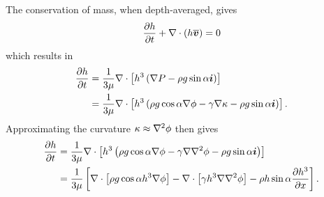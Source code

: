 The conservation of mass, when depth-averaged, gives 
\begin{align}
    \frac{\partial h}{\partial t} + \nabla \cdot \left( h\overline{\boldsymbol{v}} \right) = 0
\end{align}
which results in 
\begin{align}
    \nonumber \frac{\partial h}{\partial t} &= \frac{1}{3\mu} \nabla \cdot \left[ h^3 \left( \nabla P - \rho g \sin \alpha \boldsymbol{i} \right) \right]\\
    &= \frac{1}{3\mu} \nabla \cdot \left[ h^3 \left( \rho g \cos\alpha \nabla \phi - \gamma\nabla\kappa - \rho g \sin \alpha \boldsymbol{i} \right) \right]. 
\end{align}
Approximating the curvature $\kappa \approx \nabla^2 \phi$ then gives 
\begin{align}
    \nonumber \frac{\partial h}{\partial t} &= \frac{1}{3\mu} \nabla \cdot \left[ h^3 \left( \rho g \cos\alpha \nabla \phi - \gamma\nabla\nabla^2\phi - \rho g \sin \alpha \boldsymbol{i} \right) \right]\\
    &= \frac{1}{3\mu} \left[  \nabla \cdot \left[ \rho g \cos \alpha h^3 \nabla \phi \right] - \nabla \cdot \left[ \gamma h^3 \nabla\nabla^2\phi \right] - \rho h \sin\alpha \frac{\partial h^3}{\partial x}  \right].
    \label{eq:thin_film_dim}
\end{align}

